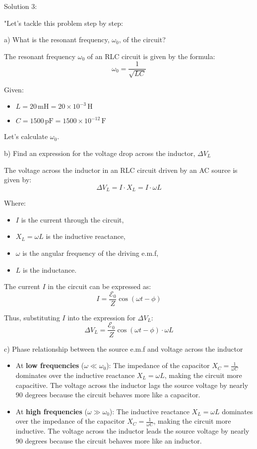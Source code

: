 Solution 3:

"Let's tackle this problem step by step:

a) What is the resonant frequency, \( \omega_{0} \), of the circuit?

The resonant frequency \( \omega_{0} \) of an RLC circuit is given by the formula:
\[ \omega_{0} = \frac{1}{\sqrt{LC}} \]

Given:
\begin{itemize}
    \item \( L = 20 \, \text{mH} = 20 \times 10^{-3} \, \text{H} \)
    \item \( C = 1500 \, \text{pF} = 1500 \times 10^{-12} \, \text{F} \)
\end{itemize}

Let's calculate \( \omega_{0} \).

b) Find an expression for the voltage drop across the inductor, \( \Delta V_{L} \)

The voltage across the inductor in an RLC circuit driven by an AC source is given by:
\[ \Delta V_{L} = I \cdot X_{L} = I \cdot \omega L \]

Where:
\begin{itemize}
    \item \( I \) is the current through the circuit,
    \item \( X_{L} = \omega L \) is the inductive reactance,
    \item \( \omega \) is the angular frequency of the driving e.m.f,
    \item \( L \) is the inductance.
\end{itemize}

The current \( I \) in the circuit can be expressed as:
\[ I = \frac{\mathcal{E}_{0}}{Z} \cos(\omega t - \phi) \]

Thus, substituting \( I \) into the expression for \( \Delta V_{L} \):
\[ \Delta V_{L} = \frac{\mathcal{E}_{0}}{Z} \cos(\omega t - \phi) \cdot \omega L \]

c) Phase relationship between the source e.m.f and voltage across the inductor

\begin{itemize}
    \item At \textbf{low frequencies} (\( \omega \ll \omega_{0} \)):
    The impedance of the capacitor \( X_{C} = \frac{1}{\omega C} \) dominates over the inductive reactance \( X_{L} = \omega L \), making the circuit more capacitive. The voltage across the inductor lags the source voltage by nearly 90 degrees because the circuit behaves more like a capacitor.
    
    \item At \textbf{high frequencies} (\( \omega \gg \omega_{0} \)):
    The inductive reactance \( X_{L} = \omega L \) dominates over the impedance of the capacitor \( X_{C} = \frac{1}{\omega C} \), making the circuit more inductive. The voltage across the inductor leads the source voltage by nearly 90 degrees because the circuit behaves more like an inductor.
\end{itemize}

